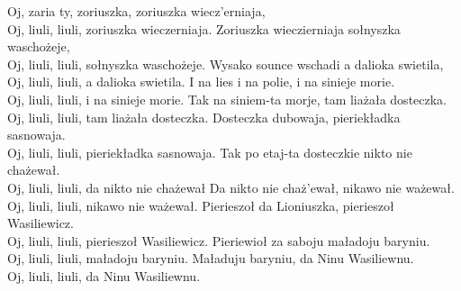 
\hops
Oj, zaria ty, zoriuszka, zoriuszka wiecz'erniaja,\\
Oj, liuli, liuli, zoriuszka wieczerniaja.
\hops
Zoriuszka wieczierniaja sołnyszka waschożeje,\\
Oj, liuli, liuli, sołnyszka waschożeje.
\hops
Wysako sounce wschadi a dalioka swietila,\\
Oj, liuli, liuli, a dalioka swietila.
\hops
I na lies i na polie, i na sinieje morie.\\
Oj, liuli, liuli, i na sinieje morie.
\hops
Tak na siniem-ta morje, tam liażała dosteczka.\\
Oj, liuli, liuli, tam liażała dosteczka.
\hops
Dosteczka dubowaja, pieriekładka sasnowaja.\\
Oj, liuli, liuli, pieriekładka sasnowaja.
\hops
Tak po etaj-ta dosteczkie nikto nie chażewał.\\
Oj, liuli, liuli, da nikto nie chażewał
\hops
Da nikto nie chaż'ewał, nikawo nie ważewał.\\
Oj, liuli, liuli, nikawo nie ważewał.
\hops
Pierieszoł da Lioniuszka, pierieszoł Wasiliewicz.\\
Oj, liuli, liuli, pierieszoł Wasiliewicz.
\hops
Pieriewioł za saboju maładoju baryniu.\\
Oj, liuli, liuli, maładoju baryniu.
\hops
Maładuju baryniu, da Ninu Wasiliewnu.\\
Oj, liuli, liuli, da Ninu Wasiliewnu.
